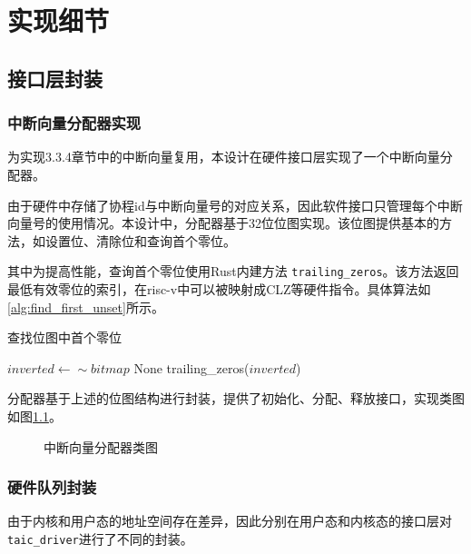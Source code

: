 \chapter{实现细节}


\section{接口层封装}

\subsection{中断向量分配器实现}

为实现3.3.4章节中的中断向量复用，本设计在硬件接口层实现了一个中断向量分配器。

由于硬件中存储了协程id与中断向量号的对应关系，因此软件接口只管理每个中断向量号的使用情况。本设计中，分配器基于32位位图实现。该位图提供基本的方法，如设置位、清除位和查询首个零位。

其中为提高性能，查询首个零位使用Rust内建方法 \verb|trailing_zeros|。该方法返回最低有效零位的索引，在risc-v中可以被映射成CLZ等硬件指令。具体算法如\ref{alg:find_first_unset}所示。


\begin{algorithm}
  \caption{查找位图中首个零位}
  \label{alg:find_first_unset}
  \begin{algorithmic}
    \State $inverted \gets \sim bitmap$
    \State \Return None
    \Else
    \State \Return trailing\_zeros($\textit{inverted}$)
    \EndIf
    \EndFunction
  \end{algorithmic}
\end{algorithm}

分配器基于上述的位图结构进行封装，提供了初始化、分配、释放接口，实现类图如图\ref{中断向量分配器类图}。

\begin{figure}[htbp]
  \centering
  
  \caption{中断向量分配器类图}\label{中断向量分配器类图}
\end{figure}


\subsection{硬件队列封装}

由于内核和用户态的地址空间存在差异，因此分别在用户态和内核态的接口层对\texttt{taic\_driver}进行了不同的封装。

